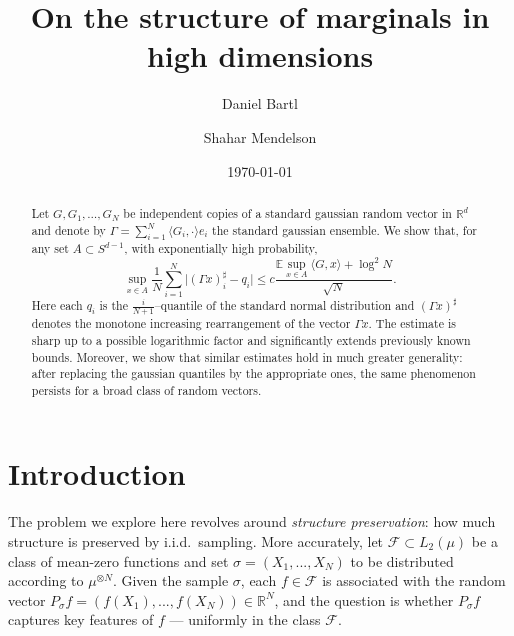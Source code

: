 \documentclass[11pt]{amsart}
\newcommand{\R}{\mathbb{R}}
\theoremstyle{definition}
\numberwithin{equation}{section}
\begin{document}
\title{On the structure of marginals in high dimensions}

\author{Daniel Bartl}
\address{Department of Mathematics, Department of Statistics and Data Science, National University of Singapore}
\author{Shahar Mendelson}
\address{Department of Mathematics,  Texas A\&M University}
\date{\today}


\begin{abstract}
Let $G, G_1,\dots,G_N$ be independent copies of a standard gaussian random vector in $\mathbb{R}^d$ and denote by $\Gamma = \sum_{i=1}^N  \langle G_i,\cdot\rangle e_i$ the standard gaussian ensemble. We show that, for any set $A\subset S^{d-1}$, with exponentially high probability,
\[
\sup_{x\in A} \frac{1}{N}\sum_{i=1}^N \big| (\Gamma x)^\sharp_i - q_i\big|
\le  c \frac{ \mathbb{E} \sup_{x\in A} \langle G,x\rangle  +  \log^2N }{\sqrt N }.
\]
Here each $q_i$ is  the $\frac{i}{N+1}$--quantile of the standard normal distribution and $(\Gamma x)^\sharp $ denotes the monotone increasing rearrangement of the vector $\Gamma x$.
The estimate is sharp up to a possible logarithmic factor and significantly extends previously known bounds. Moreover, we show that similar estimates hold in much greater generality: after replacing the gaussian quantiles by the appropriate ones, the same phenomenon persists for a broad class of random vectors.
\end{abstract}



\maketitle
\setcounter{equation}{0}
\setcounter{tocdepth}{1}




\section{Introduction}

The problem we explore here revolves around \emph{structure preservation}: how much structure is preserved by i.i.d.\ sampling. 
More accurately, let $\mathcal{F} \subset L_2(\mu)$ be a class of mean-zero functions and set $\sigma=(X_1,...,X_N)$ to be distributed according to $\mu^{\otimes N}$. 
Given the sample $\sigma$, each $f \in \mathcal{F}$ is associated with the random vector $P_\sigma f = \left(f(X_1),...,f(X_N)\right) \in \R^N$, and the question is whether  $P_\sigma f$ captures key features of $f$ --- uniformly in the class $\mathcal{F}$. 
\end{document}
